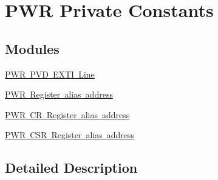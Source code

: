 \hypertarget{group___p_w_r___private___constants}{}\section{P\+WR Private Constants}
\label{group___p_w_r___private___constants}
\subsection*{Modules}
\begin{DoxyCompactItemize}
\item 
\mbox{\hyperlink{group___p_w_r___p_v_d___e_x_t_i___line}{P\+W\+R P\+V\+D E\+X\+T\+I Line}}
\item 
\mbox{\hyperlink{group___p_w_r__register__alias__address}{P\+W\+R Register alias address}}
\item 
\mbox{\hyperlink{group___p_w_r___c_r__register__alias}{P\+W\+R C\+R Register alias address}}
\item 
\mbox{\hyperlink{group___p_w_r___c_s_r__register__alias}{P\+W\+R C\+S\+R Register alias address}}
\end{DoxyCompactItemize}


\subsection{Detailed Description}
